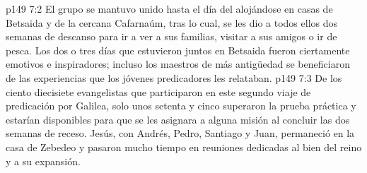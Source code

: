\vs p149 7:2 El grupo se mantuvo unido hasta el día del  alojándose en casas de Betsaida y de la cercana Cafarnaúm, tras lo cual, se les dio a todos ellos dos semanas de descanso para ir a ver a sus familias, visitar a sus amigos o ir de pesca. Los dos o tres días que estuvieron juntos en Betsaida fueron ciertamente emotivos e inspiradores; incluso los maestros de más antigüedad se beneficiaron de las experiencias que los jóvenes predicadores les relataban.
\vs p149 7:3 De los ciento diecisiete evangelistas que participaron en este segundo viaje de predicación por Galilea, solo unos setenta y cinco superaron la prueba práctica y estarían disponibles para que se les asignara a alguna misión al concluir las dos semanas de receso. Jesús, con Andrés, Pedro, Santiago y Juan, permaneció en la casa de Zebedeo y pasaron mucho tiempo en reuniones dedicadas al bien del reino y a su expansión.
